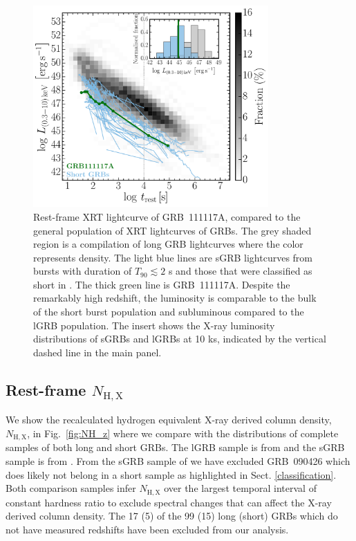 \documentclass{aa}    %
\begin{document}
\begin{figure}
	\centering
	\includegraphics[width=9cm]{figures/XLC_111117A_rest.pdf}
	\caption{Rest-frame XRT lightcurve of GRB~111117A, compared to the general population of XRT lightcurves of GRBs. The grey shaded region is a compilation of long GRB lightcurves \citep{Evans2007, Evans2009} where the color represents density. The light blue lines are sGRB lightcurves from bursts with duration of $T_{90} \lesssim 2$ s and those that were classified as short in \citet{Kann2011, Berger2014, DAvanzo2014a}. The thick green line is GRB~111117A. Despite the remarkably high redshift, the luminosity is comparable to the bulk of the short burst population and subluminous compared to the lGRB population. The insert shows the X-ray luminosity distributions of sGRBs and lGRBs at 10 ks, indicated by the vertical dashed line in the main panel.}
	\label{fig:sxray_lightcurve}
\end{figure}

\subsection{Rest-frame $N_\mathrm{H,X}$ } \label{restnH}

We show the recalculated hydrogen equivalent X-ray derived column density,
$N_\mathrm{H,X}$, in Fig.~\ref{fig:NH_z} where we compare with the distributions
of complete samples of both long and short GRBs. The lGRB sample is from
\citet{Arcodia2016} and the sGRB sample is from \citet{DAvanzo2014a}. From the
sGRB sample of \citet{DAvanzo2014a} we have excluded GRB~090426 which does
likely not belong in a short sample as highlighted in Sect.
\ref{classification}. Both comparison samples infer $N_\mathrm{H,X}$  over the
largest temporal interval of constant hardness ratio to exclude spectral changes
that can affect the X-ray derived column density. The 17 (5) of the 99 (15) long
(short) GRBs which do not have measured redshifts have been excluded from our
analysis.
\end{document}
